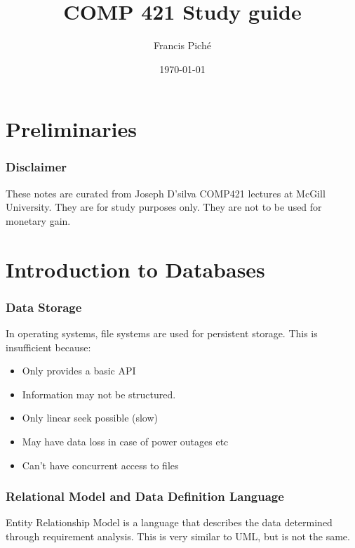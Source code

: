 \documentclass[12pt]{article}
\theoremstyle{definition}
\begin{document}
\title{COMP 421 Study guide}
\author{Francis Pich\'e}
\date{\today}
\maketitle
\newpage
\tableofcontents
\newpage

\part{Preliminaries}
\section{Disclaimer}
These notes are curated from Joseph D'silva COMP421 lectures at McGill University. They are for study purposes only. They are not to be used for monetary gain.

\part{Introduction to Databases}
\section{Data Storage}
In operating systems, file systems are used for persistent storage. This is insufficient because:
\begin{itemize}
	\item Only provides a basic API
	\item Information may not be structured.
	\item Only linear seek possible (slow)
	\item May have data loss in case of power outages etc
	\item Can't have concurrent access to files
\end{itemize}

\section{Relational Model and Data Definition Language}
Entity Relationship Model is a language that describes the data determined through requirement analysis. This is very similar to UML, but is not the same. 
\end{document}
